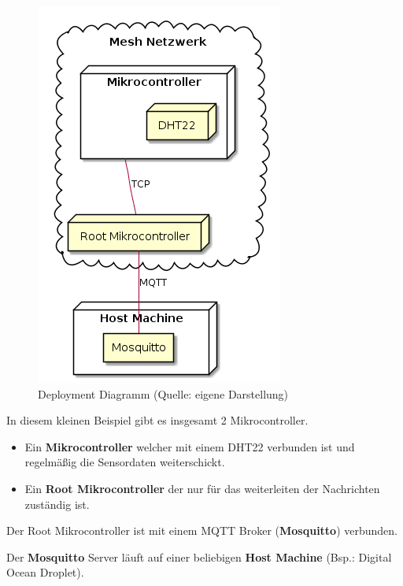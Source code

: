 \vspace*{50px}
\begin{figure}[H]
    \begin{center}
        \includegraphics[scale=.5]{diagrams/mqtt_dht22_example_deployment.png}
        \caption{Deployment Diagramm (Quelle: eigene Darstellung)}
        \label{abb:dht22_deployment_diagram}
    \end{center}    
\end{figure}

In diesem kleinen Beispiel gibt es insgesamt 2 Mikrocontroller. 

\begin{itemize}
    \item Ein \textbf{Mikrocontroller} welcher mit einem DHT22 verbunden ist und regelmäßig die Sensordaten weiterschickt.
    \item Ein \textbf{Root Mikrocontroller} der nur für das weiterleiten der Nachrichten zuständig ist.
\end{itemize}

Der Root Mikrocontroller ist mit einem MQTT Broker (\textbf{Mosquitto}) verbunden.

Der \textbf{Mosquitto} Server läuft auf einer beliebigen \textbf{Host Machine} (Bsp.: Digital Ocean Droplet).

